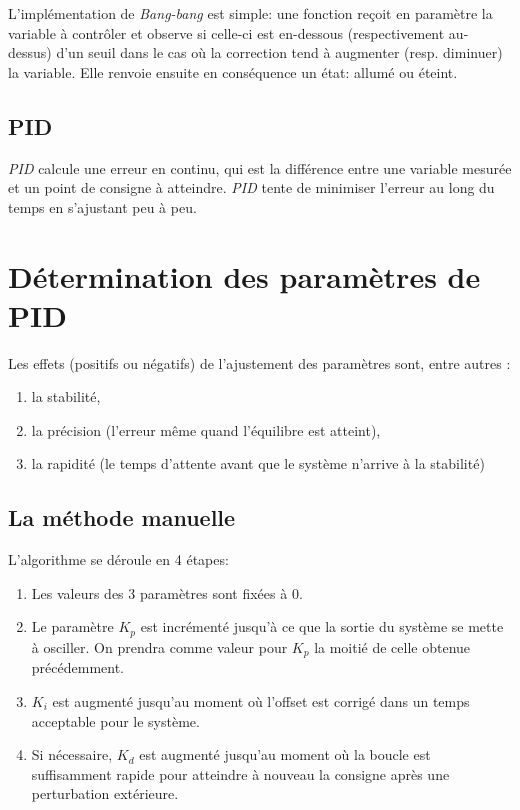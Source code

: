 \documentclass[a4paper,10pt]{report}
\begin{document}
L'implémentation de \emph{Bang-bang} est simple: une fonction reçoit en paramètre la variable à contrôler et observe si celle-ci est en-dessous (respectivement au-dessus) d'un seuil dans le cas où la correction tend à augmenter (resp. diminuer) la variable. Elle renvoie ensuite en conséquence un état: allumé ou éteint.

\subsection{PID}

\emph{PID} calcule une erreur en continu, qui est la différence entre une variable mesurée et un point de consigne à atteindre.
\emph{PID} tente de minimiser l'erreur au long du temps en s'ajustant peu à peu.




\section{Détermination des paramètres de PID} %
Les effets (positifs ou négatifs) de l'ajustement des paramètres sont, entre autres \cite{zhong2006pid} :
\begin{enumerate}
\item la stabilité,
\item la précision (l'erreur même quand l'équilibre est atteint),
\item la rapidité (le temps d'attente avant que le système n'arrive à la stabilité)
\end{enumerate}

\subsection{La méthode manuelle}

L'algorithme se déroule en 4 étapes:
\begin{enumerate}
    \item Les valeurs des 3 paramètres sont fixées à $0$.
    \item Le paramètre $K_p$ est incrémenté jusqu'à ce que la sortie du système se mette à osciller.
    On prendra comme valeur pour $K_p$ la moitié de celle obtenue précédemment.
    \item $K_i$ est augmenté jusqu'au moment où l'offset est corrigé dans un temps acceptable pour le système.
    \item Si nécessaire, $K_d$ est augmenté jusqu'au moment où la boucle est suffisamment rapide pour atteindre à nouveau la consigne après une perturbation extérieure.
\end{enumerate}
\end{document}
